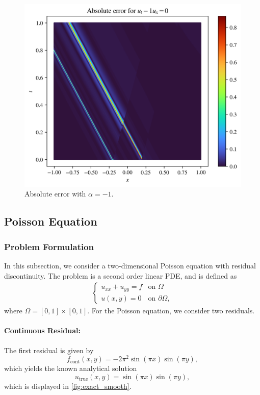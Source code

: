 \begin{figure}[h!]
    \centering
    \includegraphics[width=0.8\linewidth]{Project1XPINNs/figures/advection/-1_error.png}
    \caption{Absolute error with $\alpha=-1$.}
    \label{fig:alpha-1_error}
\end{figure}


\subsection{Poisson Equation}
\subsubsection{Problem Formulation}
In this subsection, we consider a two-dimensional Poisson equation with residual discontinuity.
The problem is a second order linear PDE, and is defined as
\begin{align}\label{eq:poisson}
\begin{cases}
    u_{xx}+u_{yy} = f &\text{on } \Omega \\
    u(x,y) = 0 &\text{on } \partial\Omega,
\end{cases}
\end{align}
where $\Omega = [0,1] \times [0,1]$.
For the Poisson equation, we consider two residuals.

\paragraph{Continuous Residual:}
The first residual is given by
\begin{equation}\label{eq:continuous_poisson}
    f_{\text{cont}}(x,y)= -2\pi^2\sin(\pi x) \sin(\pi y),
\end{equation}
which yields the known analytical solution
\begin{equation*}
    u_{\text{true}}(x,y)=\sin(\pi x) \sin(\pi y),
\end{equation*}
which is displayed in \autoref{fig:exact_smooth}.

